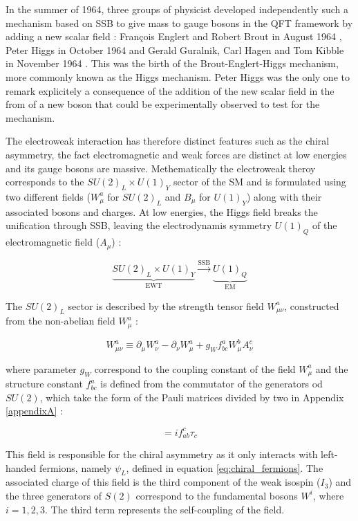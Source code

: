 In the summer of 1964, three groups of physicist developed independently such a mechanism based on SSB to give mass to gauge bosons in the QFT framework by adding a new scalar field : François Englert and Robert Brout in August 1964 \cite{PhysRevLett.13.321}, Peter Higgs in October 1964 \cite{HIGGS1964132,PhysRevLett.13.508} and Gerald Guralnik, Carl Hagen and Tom Kibble in November 1964 \cite{PhysRevLett.13.585}. This was the birth of the Brout-Englert-Higgs mechanism, more commonly known as the Higgs mechanism. Peter Higgs was the only one to remark explicitely a consequence of the addition of the new scalar field in the from of a new boson that could be experimentally observed to test for the mechanism. 

The electroweak interaction has therefore distinct features such as the chiral asymmetry, the fact electromagnetic and weak forces are distinct at low energies and its gauge bosons are massive. Methematically the electroweak theroy corresponds to the $SU(2)_L \times U(1)_Y$ sector of the SM and is formulated using two different fields ($W_{\mu}^a$ for $SU(2)_L$ and $B_{\mu}$ for $U(1)_Y$) along with their associated bosons and charges. At low energies, the Higgs field breaks the unification through SSB, leaving the electrodynamis symmetry $U(1)_Q$ of the electromagnetic field ($A_{\mu}$) :

\begin{equation}
    \underbrace{SU(2)_L \times U(1)_Y}_\text{EWT} \xrightarrow{\text{SSB}} \underbrace{U(1)_Q}_{\text{EM}}
\end{equation}

The $SU(2)_L$ sector is described by the strength tensor field $W_{\mu\nu}^a$, constructed from the non-abelian field $W_{\mu}^a$ :

\begin{equation}
    W_{\mu\nu}^a \equiv \partial_{\mu} W_{\nu}^a - \partial_{\nu} W_{\mu}^a + g_W f_{bc}^a W_{\mu}^b A_{\nu}^c
\end{equation}

where parameter $g_W$ correspond to the coupling constant of the field $W_{\mu}^a$ and the structure constant $f_{bc}^a$ is defined from the commutator of the generators od $SU(2)$, which take the form of the Pauli matrices divided by two in Appendix \ref{appendixA} :

\begin{equation}
    [\tau_a , \tau_b] = if_{ab}^c \tau_c
\end{equation}

This field is responsible for the chiral asymmetry as it only interacts with left-handed fermions, namely $\psi_L$, defined in equation \ref{eq:chiral_fermions}. The associated charge of this field is the third component of the weak isospin ($I_3$) and the three generators of $S(2)$ correspond to the fundamental bosons $W^i$, where $i = {1,2,3}$. The third term represents the self-coupling of the field.

